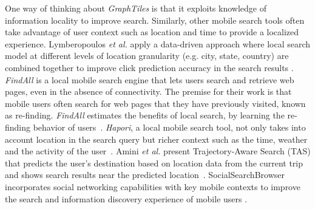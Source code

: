 


One way of thinking about \textit{GraphTiles} is that it exploits knowledge of information locality to improve search. Similarly, other mobile search tools often take advantage of user context such as location and time to provide a localized experience. Lymberopoulos \textit{et al.} apply a data-driven approach where local search model at different levels of location granularity (e.g. city, state, country) are combined together to improve click prediction accuracy in the search results \cite{Lymberopoulos:2011}. \textit{FindAll} is a local mobile search engine that lets users search and retrieve web pages, even in the absence of connectivity. The premise for their work is that mobile users often search for web pages that they have previously visited, known as re-finding. \textit{FindAll} estimates the benefits of local search, by learning the re-finding behavior of users~\cite{Balasubramanian:2012}. \textit{Hapori}, a local mobile search tool,  not only takes into account location in the search query but richer context such as the time, weather and the activity of the user~\cite{Lane:2010}. Amini \textit{et al.} present Trajectory-Aware Search (TAS) that predicts the user's destination based on location data from the current trip and shows search results near the predicted location~\cite{Amini:2012}. SocialSearchBrowser incorporates social networking capabilities with key mobile contexts to improve the search and information discovery experience of mobile users \cite{Church:2010}.

